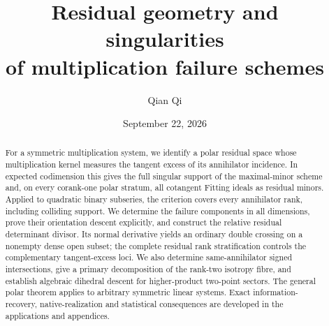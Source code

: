 \documentclass[11pt,reqno]{amsart}
\title[Residual geometry of multiplication failure]{Residual geometry and singularities\\of multiplication failure schemes}
\author{Qian Qi}
\date{September 22, 2026}
\numberwithin{equation}{section}
\theoremstyle{definition}\newtheorem{definition}[theorem]{Definition}
\theoremstyle{remark}\newtheorem{remark}[theorem]{Remark}
\begin{document}
\begin{abstract}
For a symmetric multiplication system, we identify a polar residual space whose multiplication kernel measures the tangent excess of its annihilator incidence. In expected codimension this gives the full singular support of the maximal-minor scheme and, on every corank-one polar stratum, all cotangent Fitting ideals as residual minors. Applied to quadratic binary subseries, the criterion covers every annihilator rank, including colliding support. We determine the failure components in all dimensions, prove their orientation descent explicitly, and construct the relative residual determinant divisor. Its normal derivative yields an ordinary double crossing on a nonempty dense open subset; the complete residual rank stratification controls the complementary tangent-excess loci. We also determine same-annihilator signed intersections, give a primary decomposition of the rank-two isotropy fibre, and establish algebraic dihedral descent for higher-product two-point sectors. The general polar theorem applies to arbitrary symmetric linear systems. Exact information-recovery, native-realization and statistical consequences are developed in the applications and appendices.
\end{abstract}
\maketitle









\appendix








\end{document}
